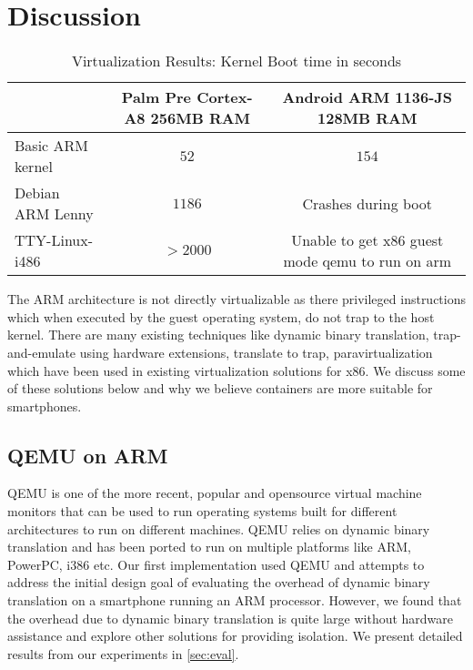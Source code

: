 \section{Discussion}
\label{sec:discuss}

\begin{table*}[tbh]
\begin{tabular}{|l|c|c|}
\hline & Palm Pre Cortex-A8 256MB RAM & Android ARM 1136-JS 128MB RAM \\ 
\hline Basic ARM kernel & $52$ & $154$ \\ [2pt]
 Debian ARM Lenny & $1186$ & Crashes during boot \\ [2pt]
 TTY-Linux-i486 & $>2000$ & Unable to get x86 guest mode qemu to run on arm \\[2pt]
\hline 
\end{tabular}
\caption{
Virtualization Results: Kernel Boot time in seconds
}
\label{tab:virt_results}
\end{table*}

The ARM architecture is not directly virtualizable as there privileged instructions which when executed by the guest operating system, do not trap to the host kernel. There are many existing techniques like dynamic binary translation, trap-and-emulate using hardware extensions, translate to trap, paravirtualization which have been used in existing virtualization solutions for x86. We discuss some of these solutions below and why we believe containers are more suitable for smartphones.

\subsection{QEMU on ARM}
QEMU \cite{qemu} is one of the more recent, popular and opensource virtual machine monitors that can be used to run operating systems built for different architectures to run on different machines. QEMU relies on dynamic binary translation and has been ported to run on multiple platforms like ARM, PowerPC, i386 etc. Our first implementation used QEMU and attempts to address the initial design goal of evaluating the overhead of dynamic binary translation on a smartphone running an ARM processor. However, we found that the overhead due to dynamic binary translation is quite large without hardware assistance and explore other solutions for providing isolation. We present detailed results from our experiments in \ref{sec:eval}.

